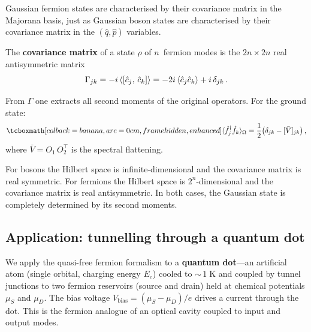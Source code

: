 Gaussian fermion states are characterised by their covariance matrix
in the Majorana basis, just as Gaussian boson states are characterised
by their covariance matrix in the $(\hat{q}, \hat{p})$ variables.

\begin{definition}\label{def:fermion-cov}
  The \textbf{covariance matrix} of a state $\rho$ of $n$~fermion
  modes is the $2n \times 2n$ real antisymmetric matrix
  \begin{equation}\label{eq:fermion-cov-def}
    \Gamma_{jk}
    = -i\,\langle [\hat{c}_j,\, \hat{c}_k] \rangle
    = -2i\,\langle \hat{c}_j \hat{c}_k \rangle + i\,\delta_{jk}\,.
  \end{equation}
\end{definition}

From $\Gamma$ one extracts all second moments of the original
operators.  For the ground state:
\begin{equation}\label{eq:fermion-second-moments}
  \eqbox{\expect{\hat{f}_j^\adj \hat{f}_k}_\Omega
  = \frac{1}{2}\bigl(\delta_{jk}
    - [\bar{V}]_{jk}\bigr)}\,,
\end{equation}
where $\bar{V} = O_1\, O_2^\top$ is the spectral flattening.

\begin{intuition}
  For bosons the Hilbert space is infinite-dimensional and the
  covariance matrix is real symmetric.  For fermions the Hilbert space
  is $2^n$-dimensional and the covariance matrix is real
  antisymmetric.  In both cases, the Gaussian state is completely
  determined by its second moments.
\end{intuition}

\subsection{Application: tunnelling through a quantum dot}%
\label{sec:quantum-dot}

We apply the quasi-free fermion formalism to a \textbf{quantum
dot}---an artificial atom (single orbital, charging energy $E_c$)
cooled to ${\sim}\,1\;\text{K}$ and coupled by tunnel junctions to
two fermion reservoirs (source and drain) held at chemical potentials
$\mu_S$ and $\mu_D$.  The bias voltage
$V_{\mathrm{bias}} = (\mu_S - \mu_D)/e$ drives a current through the
dot.  This is the fermion analogue of an optical cavity coupled to
input and output modes.

